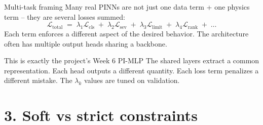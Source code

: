\documentclass[aspectratio=169,10pt]{beamer}
\begin{document}
\begin{frame}{Multi-task framing}
Many real PINNs are not just one data term + one physics term -- they are several losses summed:
\begin{equation*}
\mathcal{L}_{\text{total}} \;=\; \lambda_1 \mathcal{L}_{\text{cls}} \;+\; \lambda_2 \mathcal{L}_{\text{sev}} \;+\; \lambda_3 \mathcal{L}_{\text{limit}} \;+\; \lambda_4 \mathcal{L}_{\text{rank}} \;+\; \ldots
\end{equation*}
Each term enforces a different aspect of the desired behavior. The architecture often has multiple output heads sharing a backbone.
\vspace{0.5em}
\centering
{}
\vspace{0.4em}
\begin{block}{This is exactly the project's Week 6 PI-MLP}
The shared layers extract a common representation. Each head outputs a different quantity. Each loss term penalizes a different mistake. The $\lambda_k$ values are tuned on validation.
\end{block}
\end{frame}

\section*{3. Soft vs strict constraints}
\end{document}
